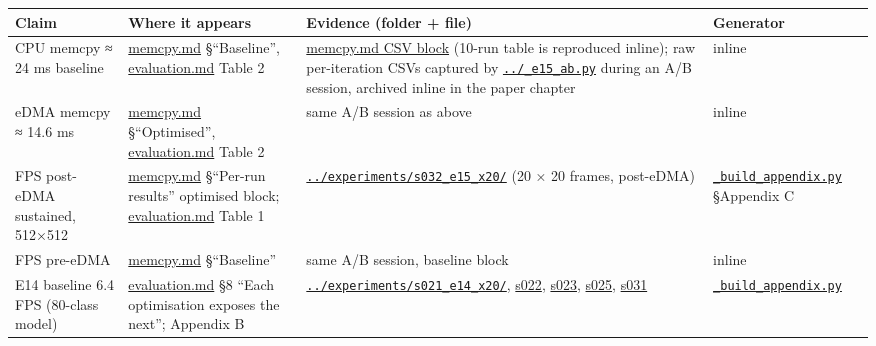 {\def\LTcaptype{none} %
\begin{longtable}[]{@{}
  >{\raggedright\arraybackslash}p{}
  >{\raggedright\arraybackslash}p{}
  >{\raggedright\arraybackslash}p{}
  >{\raggedright\arraybackslash}p{}@{}}
\toprule\noalign{}
\begin{minipage}[b]{\linewidth}\raggedright
Claim
\end{minipage} & \begin{minipage}[b]{\linewidth}\raggedright
Where it appears
\end{minipage} & \begin{minipage}[b]{\linewidth}\raggedright
Evidence (folder + file)
\end{minipage} & \begin{minipage}[b]{\linewidth}\raggedright
Generator
\end{minipage} \\
\midrule\noalign{}
\endhead
\bottomrule\noalign{}
\endlastfoot
CPU memcpy ≈ 24 ms baseline & \url{memcpy.md} §``Baseline'',
\url{evaluation.md} Table 2 & \href{memcpy.md}{memcpy.md CSV block}
(10-run table is reproduced inline); raw per-iteration CSVs captured by
\href{../_e15_ab.py}{\texttt{../\_e15\_ab.py}} during an A/B session,
archived inline in the paper chapter & inline \\
eDMA memcpy ≈ 14.6 ms & \url{memcpy.md} §``Optimised'',
\url{evaluation.md} Table 2 & same A/B session as above & inline \\
15.47 FPS post-eDMA sustained, 512×512 & \url{memcpy.md} §``Per-run
results'' optimised block; \url{evaluation.md} Table 1 &
\href{../experiments/s032_e15_x20/}{\texttt{../experiments/s032\_e15\_x20/}}
(20 × 20 frames, post-eDMA) &
\href{../experiments/_build_appendix.py}{\texttt{\_build\_appendix.py}}
§Appendix C \\
13.39 FPS pre-eDMA & \url{memcpy.md} §``Baseline'' & same A/B session,
baseline block & inline \\
E14 baseline 6.4 FPS (80-class model) & \url{evaluation.md} §8 ``Each
optimisation exposes the next''; Appendix B &
\href{../experiments/s021_e14_x20/}{\texttt{../experiments/s021\_e14\_x20/}},
\href{../experiments/s022_e14_x20/}{s022},
\href{../experiments/s023_e14_x20/}{s023},
\href{../experiments/s025_e14_x20/}{s025},
\href{../experiments/s031_e14_x20/}{s031} &
\href{../experiments/_build_appendix.py}{\texttt{\_build\_appendix.py}}

\end{longtable}}
